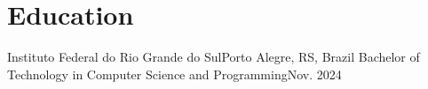 \section{Education}
  \resumeSubHeadingListStart
    \resumeSubheading
      {Instituto Federal do Rio Grande do Sul}{Porto Alegre, RS, Brazil}
      {Bachelor of Technology in Computer Science and Programming}{Nov. 2024}
  \resumeSubHeadingListEnd
